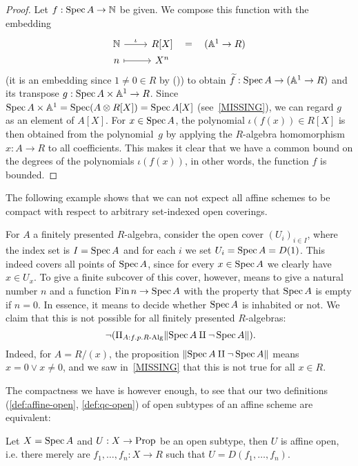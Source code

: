 \begin{proof}
  Let $f : \operatorname{Spec} A \to \mathbb{N}$ be given.
  We compose this function with the embedding
  \[ \begin{tikzcd}[row sep=0mm]
    \N \ar[r, "\iota"] & R[X] \ar[r, phantom, "{=}"] & (\bA^1 \to R) \\
    n \ar[r, mapsto] & X^n
  \end{tikzcd} \]
  (it is an embedding since $1 \neq 0 \in R$ by ())
  to obtain $\widetilde{f} : \operatorname{Spec} A \to (\mathbb{A}^1 \to R)$
  and its transpose $g : \operatorname{Spec} A \times \mathbb{A}^1 \to R$.
  Since $\operatorname{Spec} A \times \mathbb{A}^1 = \operatorname{Spec} (A \otimes R[X]) = \operatorname{Spec} A[X]$
  (see~\ref{MISSING}),
  we can regard $g$ as an element of $A[X]$.
  For $x \in \operatorname{Spec} A$,
  the polynomial $\iota(f(x)) \in R[X]$ is then obtained from the polynomial~$g$
  by applying the $R$-algebra homomorphism $x : A \to R$ to all coefficients.
  This makes it clear that
  we have a common bound on the degrees of the polynomials $\iota(f(x))$,
  in other words,
  the function $f$ is bounded.
\end{proof}

The following example shows that we can not expect all affine schemes
to be compact with respect to arbitrary set-indexed open coverings.

\begin{example}
  For $A$ a finitely presented $R$-algebra,
  consider the open cover ${(U_i)}_{i \in I}$,
  where the index set is $I = \operatorname{Spec} A$
  and for each $i$ we set $U_i = \operatorname{Spec} A = D(1)$.
  This indeed covers all points of $\operatorname{Spec} A$,
  since for every $x \in \operatorname{Spec} A$ we clearly have $x \in U_x$.
  To give a finite subcover of this cover, however,
  means to give a natural number $n$ and a function $\operatorname{Fin} n \to \operatorname{Spec} A$
  with the property that $\operatorname{Spec} A$ is empty if $n = 0$.
  In essence, it means to decide whether $\operatorname{Spec} A$ is inhabited or not.
  We claim that this is not possible for all finitely presented $R$-algebras:
  \[ \lnot (\Pi_{A : f.p. R\text{-Alg}} \propTrunc{\Spec A \amalg \lnot \Spec A} )
     \rlap{.} \]
  Indeed, for $A = R/(x)$,
  the proposition $\lVert \operatorname{Spec} A \amalg \lnot \operatorname{Spec} A \rVert$
  means $x = 0 \lor x \neq 0$,
  and we saw in~\ref{MISSING} that this is not true for all $x \in R$.
\end{example}

The compactness we have is however enough,
to see that our two definitions (\cref{def:affine-open}, \cref{def:qc-open})
of open subtypes of an affine scheme are equivalent:

\begin{theorem}%
  \label{thm:qc-open-affine-open}
  Let $X=\operatorname{Spec} A$ and $U:X\to\mathrm{Prop}$ be an open subtype,
  then $U$ is affine open, i.e. there merely are $f_1,\dots,f_n:X\to R$ such that
  $U=D(f_1,\dots,f_n)$.
\end{theorem}

